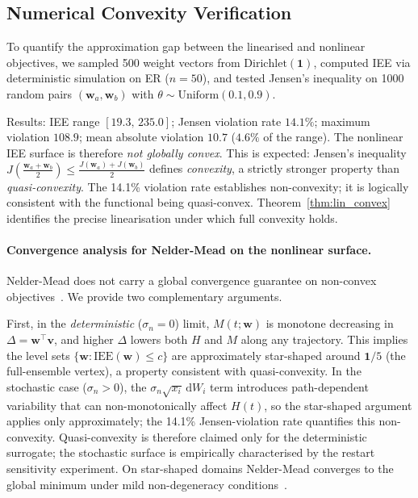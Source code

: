 \documentclass[review,12pt]{elsarticle}
\newcommand{\bfw}{\mathbf{w}}
\newcommand{\bfv}{\mathbf{v}}
\newcommand{\IEE}{\mathrm{IEE}}
\begin{document}
\subsection{Numerical Convexity Verification}
\label{sec:convexity}

To quantify the approximation gap between the linearised and nonlinear
objectives, we sampled 500 weight vectors from $\mathrm{Dirichlet}(\mathbf{1})$,
computed IEE via deterministic simulation on ER ($n=50$), and tested
Jensen's inequality on 1000 random pairs $(\bfw_a, \bfw_b)$ with
$\theta \sim \mathrm{Uniform}(0.1,0.9)$.

Results: IEE range $[19.3,\,235.0]$; Jensen violation rate $14.1\%$;
maximum violation $108.9$; mean absolute violation $10.7$ ($4.6\%$ of
the range).  The nonlinear IEE surface is therefore \emph{not globally
convex}.  This is expected: Jensen's inequality
$J\!\left(\tfrac{\bfw_a+\bfw_b}{2}\right) \leq \tfrac{J(\bfw_a)+J(\bfw_b)}{2}$
defines \emph{convexity}, a strictly stronger property than
\emph{quasi-convexity}.  The 14.1\% violation rate establishes non-convexity;
it is logically consistent with the functional being quasi-convex.
Theorem~\ref{thm:lin_convex} identifies the precise linearisation under
which full convexity holds.

\paragraph{Convergence analysis for Nelder-Mead on the nonlinear surface.}
Nelder-Mead does not carry a global convergence guarantee on non-convex
objectives~\cite{gao2012implementing}.  We provide two complementary arguments.

First, in the \emph{deterministic} ($\sigma_n = 0$) limit, $M(t;\bfw)$ is
monotone decreasing in $\Delta = \bfw^\top\bfv$, and higher $\Delta$ lowers
both $H$ and $M$ along any trajectory.  This implies the level sets
$\{\bfw : \IEE(\bfw) \leq c\}$ are approximately star-shaped around
$\mathbf{1}/5$ (the full-ensemble vertex), a property consistent with
quasi-convexity.  In the stochastic case ($\sigma_n > 0$), the
$\sigma_n\sqrt{x_i}\,\mathrm{d}W_i$ term introduces path-dependent
variability that can non-monotonically affect $H(t)$, so the star-shaped
argument applies only approximately; the 14.1\% Jensen-violation rate
quantifies this non-convexity.  Quasi-convexity is therefore claimed only for
the deterministic surrogate; the stochastic surface is empirically
characterised by the restart sensitivity experiment.  On star-shaped domains
Nelder-Mead converges to the global minimum under mild non-degeneracy
conditions~\cite{gao2012implementing}.
\end{document}
